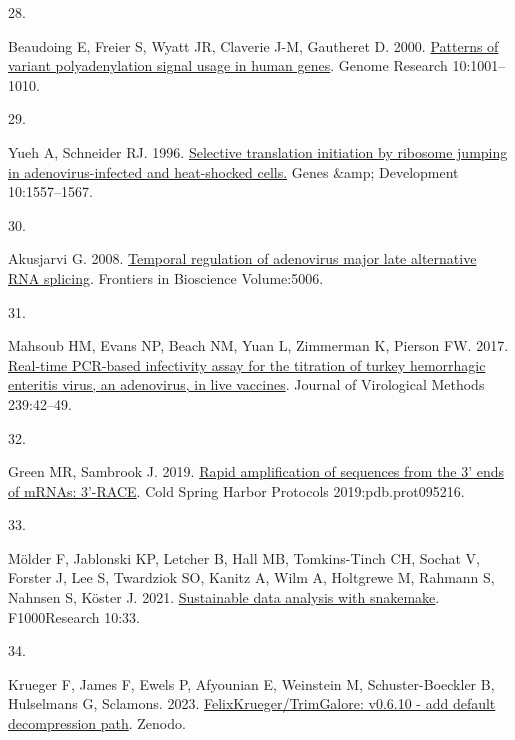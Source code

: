 \documentclass[
]{article}
\newlength{\cslhangindent}
\newlength{\csllabelwidth}
\newenvironment{CSLReferences}[2] %
 {\begin{list}{}{%
  \setlength{\itemindent}{0pt}
  \setlength{\leftmargin}{0pt}
  \setlength{\parsep}{0pt}
  \ifodd #1
   \setlength{\leftmargin}{\cslhangindent}
   \setlength{\itemindent}{-1\cslhangindent}
  \fi
  \setlength{\itemsep}{#2\baselineskip}}}
 {\end{list}}
\newcommand{\CSLLeftMargin}[1]{\parbox[t]{\csllabelwidth}{\strut#1\strut}}
\newcommand{\CSLRightInline}[1]{\parbox[t]{\linewidth - \csllabelwidth}{\strut#1\strut}}
\begin{document}
\begin{CSLReferences}{0}{1}
\CSLLeftMargin{28. }%
\CSLRightInline{Beaudoing E, Freier S, Wyatt JR, Claverie J-M, Gautheret
D. 2000. \href{https://doi.org/10.1101/gr.10.7.1001}{Patterns of variant
polyadenylation signal usage in human genes}. Genome Research
10:1001--1010.}

\CSLLeftMargin{29. }%
\CSLRightInline{Yueh A, Schneider RJ. 1996.
\href{https://doi.org/10.1101/gad.10.12.1557}{Selective translation
initiation by ribosome jumping in adenovirus-infected and heat-shocked
cells.} Genes \&amp; Development 10:1557--1567.}

\CSLLeftMargin{30. }%
\CSLRightInline{Akusjarvi G. 2008.
\href{https://doi.org/10.2741/3059}{Temporal regulation of adenovirus
major late alternative RNA splicing}. Frontiers in Bioscience
Volume:5006.}

\CSLLeftMargin{31. }%
\CSLRightInline{Mahsoub HM, Evans NP, Beach NM, Yuan L, Zimmerman K,
Pierson FW. 2017.
\href{https://doi.org/10.1016/j.jviromet.2016.11.002}{Real-time
{PCR}-based infectivity assay for the titration of turkey hemorrhagic
enteritis virus, an adenovirus, in live vaccines}. Journal of
Virological Methods 239:42--49.}

\CSLLeftMargin{32. }%
\CSLRightInline{Green MR, Sambrook J. 2019.
\href{https://doi.org/10.1101/pdb.prot095216}{Rapid amplification of
sequences from the 3' ends of mRNAs: 3'-RACE}. Cold Spring Harbor
Protocols 2019:pdb.prot095216.}

\CSLLeftMargin{33. }%
\CSLRightInline{Mölder F, Jablonski KP, Letcher B, Hall MB,
Tomkins-Tinch CH, Sochat V, Forster J, Lee S, Twardziok SO, Kanitz A,
Wilm A, Holtgrewe M, Rahmann S, Nahnsen S, Köster J. 2021.
\href{https://doi.org/10.12688/f1000research.29032.2}{Sustainable data
analysis with snakemake}. F1000Research 10:33.}

\CSLLeftMargin{34. }%
\CSLRightInline{Krueger F, James F, Ewels P, Afyounian E, Weinstein M,
Schuster-Boeckler B, Hulselmans G, Sclamons. 2023.
\href{https://doi.org/10.5281/ZENODO.7598955}{FelixKrueger/TrimGalore:
v0.6.10 - add default decompression path}. Zenodo.}

\end{CSLReferences}

\setlength{\parindent}{0in}
\setlength{\leftskip}{0in}
\newpage
\end{document}
